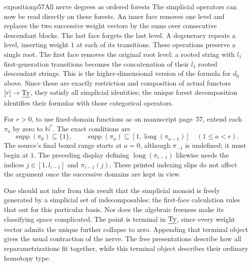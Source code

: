 \begin{dcomment}{exposition}{p57}{All nerve degrees as ordered forests}
The simplicial operators can now be read directly on these forests. An inner face removes one level and replaces the two successive weight vectors by the sums over consecutive descendant blocks. The last face forgets the last level. A degeneracy repeats a level, inserting weight $1$ at each of its transitions. These operations preserve a single root. The first face removes the original root level: a rooted string with $l_1$ first-generation transitions becomes the concatenation of their $l_1$ rooted descendant strings. This is the higher-dimensional version of the formula for $d_0$ above. Since these are exactly restriction and composition of actual functors $[r]\to\underline{\mathrm{Ty}}$, they satisfy all simplicial identities; the unique forest decomposition identifies their formulas with those categorical operators.

For $r>0$, to use fixed-domain functions as on manuscript page~57, extend each $\pi_a$ by zero to $\mathbb N^*$. The exact conditions are
\[
 \operatorname{supp}(\pi_0)\subseteq\{1\},\qquad
 \operatorname{supp}(\pi_a)\subseteq
       [1,\operatorname{long}(\pi_{a-1})]
       \quad(1\leq a<r).
\]
The source's final boxed range starts at $a=0$, although $\pi_{-1}$ is undefined; it must begin at $1$. The preceding display defining $\operatorname{long}(\pi_{i-1})$ likewise needs the indices $j\in[1,l_{i-1}]$ and $\pi_{i-1}(j)$. These printed indexing slips do not affect the argument once the successive domains are kept in view.

One should not infer from this result that the simplicial monoid is freely generated by a simplicial set of indecomposables: the first-face calculation rules that out for this particular basis. Nor does the algebraic freeness make its classifying space complicated. The point is terminal in $\underline{\mathrm{Ty}}$, since every weight vector admits the unique further collapse to zero. Appending that terminal object gives the usual contraction of the nerve. The free presentations describe how all reparametrizations fit together, while this terminal object describes their ordinary homotopy type.
\end{dcomment}


